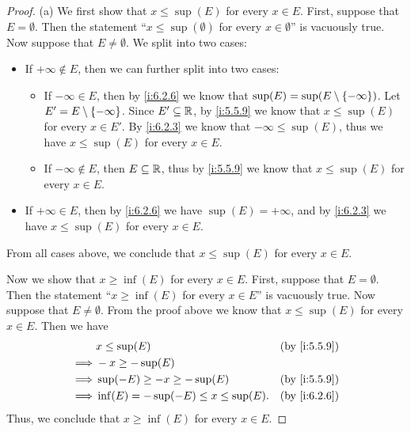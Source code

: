 \begin{proof}{(a)}
  We first show that \(x \leq \sup(E)\) for every \(x \in E\).
  First, suppose that \(E = \emptyset\).
  Then the statement ``\(x \leq \sup(\emptyset)\) for every \(x \in \emptyset\)'' is vacuously true.
  Now suppose that \(E \neq \emptyset\).
  We split into two cases:
  \begin{itemize}
    \item If \(+\infty \not\in E\), then we can further split into two cases:
          \begin{itemize}
            \item If \(-\infty \in E\), then by \cref{i:6.2.6} we know that \(\sup(E) = \sup(E \setminus \left\lbrace-\infty\right\rbrace)\).
                  Let \(E' = E \setminus \left\lbrace-\infty\right\rbrace\).
                  Since \(E' \subseteq \mathbb{R}\), by \cref{i:5.5.9} we know that \(x \leq \sup(E)\) for every \(x \in E'\).
                  By \cref{i:6.2.3} we know that \(-\infty \leq \sup(E)\), thus we have \(x \leq \sup(E)\) for every \(x \in E\).
            \item If \(-\infty \notin E\), then \(E \subseteq \mathbb{R}\), thus by \cref{i:5.5.9} we know that \(x \leq \sup(E)\) for every \(x \in E\).
          \end{itemize}
    \item If \(+\infty \in E\), then by \cref{i:6.2.6} we have \(\sup(E) = +\infty\), and by \cref{i:6.2.3} we have \(x \leq \sup(E)\) for every \(x \in E\).
  \end{itemize}
  From all cases above, we conclude that \(x \leq \sup(E)\) for every \(x \in E\).

  Now we show that \(x \geq \inf(E)\) for every \(x \in E\).
  First, suppose that \(E = \emptyset\).
  Then the statement ``\(x \geq \inf(E)\) for every \(x \in E\)'' is vacuously true.
  Now suppose that \(E \neq \emptyset\).
  From the proof above we know that \(x \leq \sup(E)\) for every \(x \in E\).
  Then we have
  \begin{align*}
             & x \leq \sup(E)                           &  & \by{i:5.5.9} \\
    \implies & -x \geq -\sup(E)                                           \\
    \implies & \sup(-E) \geq -x \geq -\sup(E)           &  & \by{i:5.5.9} \\
    \implies & \inf(E) = -\sup(-E) \leq x \leq \sup(E). &  & \by{i:6.2.6}
  \end{align*}
  Thus, we conclude that \(x \geq \inf(E)\) for every \(x \in E\).
\end{proof}

